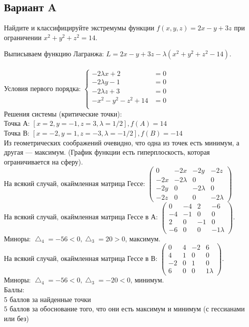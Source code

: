 \documentclass[addpoints, answers]{exam} %
\begin{document}
\subsection{Вариант A}
\begin{questions}
\question[10] Найдите и классифицируйте экстремумы функции $f(x,y,z)=2x-y+3z$ при ограничении $x^2+y^2+z^2=14$.\\
\begin{solution}

Выписываем функцию Лагранжа: $L=2x-y+3z-\lambda (x^2+y^2+z^2-14)$.\\\\
Условия первого порядка:
$\left\{\begin{aligned}
-2\lambda x+2&=0\\
-2\lambda y-1&=0\\
-2\lambda z+3&=0\\
-x^2-y^2-z^2+14&=0\\
\end{aligned}\right.$\\
Решения системы (критические точки): \\
Точка А: $\left[ x=2,y=-1,z=3,\lambda=1/2\right], f(A)=14$\\
Точка В: $\left[ x=-2,y=1,z=-3,\lambda=-1/2\right], f(B)=-14$\\
Из геометрических соображений очевидно, что одна из точек есть минимум, а другая --- максимум. (График функции есть гиперплоскость, которая ограничивается на сферу).\\
На всякий случай, окаймленная матрица Гессе:
$\left(\begin{array}{cccc}
0 & -2x & -2y & -2z\\
-2x & -2\lambda & 0 & 0\\
-2y & 0 & -2\lambda & 0\\
-2z & 0 & 0 & -2\lambda
\end{array}\right)$\\
На всякий случай, окаймленная матрица Гессе в А: 
$\left(\begin{array}{cccc}
0 & -4 & 2 & -6\\
-4 & -1 & 0 & 0\\
2 & 0 & -1 & 0\\
-6 & 0 & 0 & -1\lambda
\end{array}\right)$.\\
Миноры: $\bigtriangleup_4=-56<0, \bigtriangleup_3=20>0$, максимум.\\
На всякий случай, окаймленная матрица Гессе в В: 
$\left(\begin{array}{cccc}
0 & 4 & -2 & 6\\
4 & 1 & 0 & 0\\
-2 & 0 & 1 & 0\\
6 & 0 & 0 & 1\lambda
\end{array}\right)$.\\
Миноры: $\bigtriangleup_4=-56<0, \bigtriangleup_3=-20<0$, минимум.\\
Баллы:\\
5 баллов за найденные точки\\
5 баллов за обоснование того, что они есть максимум и минимум (с гессианами или без)


\end{solution}
\end{questions}
\end{document}
